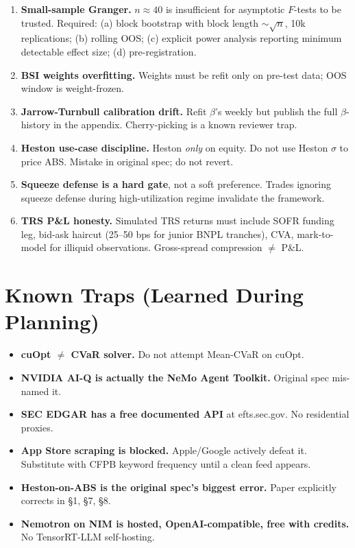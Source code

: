 \documentclass[11pt]{article}
\newcommand{\inlinecode}[1]{{\ttfamily\small #1}}
\begin{document}
\begin{enumerate}
  \item \textbf{Small-sample Granger.} $n \approx 40$ is insufficient for asymptotic $F$-tests to be trusted. Required: (a) block bootstrap with block length $\sim \sqrt{n}$, 10k replications; (b) rolling OOS; (c) explicit power analysis reporting minimum detectable effect size; (d) pre-registration.
  \item \textbf{BSI weights overfitting.} Weights must be refit only on pre-test data; OOS window is weight-frozen.
  \item \textbf{Jarrow-Turnbull calibration drift.} Refit $\beta$'s weekly but publish the full $\beta$-history in the appendix. Cherry-picking is a known reviewer trap.
  \item \textbf{Heston use-case discipline.} Heston \emph{only} on equity. Do not use Heston $\sigma$ to price ABS. Mistake in original spec; do not revert.
  \item \textbf{Squeeze defense is a hard gate}, not a soft preference. Trades ignoring squeeze defense during high-utilization regime invalidate the framework.
  \item \textbf{TRS P\&L honesty.} Simulated TRS returns must include SOFR funding leg, bid-ask haircut (25--50 bps for junior BNPL tranches), CVA, mark-to-model for illiquid observations. Gross-spread compression $\ne$ P\&L.
\end{enumerate}

\section{Known Traps (Learned During Planning)}

\begin{itemize}
  \item \textbf{cuOpt $\ne$ CVaR solver.} Do not attempt Mean-CVaR on cuOpt.
  \item \textbf{NVIDIA AI-Q is actually the NeMo Agent Toolkit.} Original spec mis-named it.
  \item \textbf{SEC EDGAR has a free documented API} at \inlinecode{efts.sec.gov}. No residential proxies.
  \item \textbf{App Store scraping is blocked.} Apple/Google actively defeat it. Substitute with CFPB keyword frequency until a clean feed appears.
  \item \textbf{Heston-on-ABS is the original spec's biggest error.} Paper explicitly corrects in \S1, \S7, \S8.
  \item \textbf{Nemotron on NIM is hosted, OpenAI-compatible, free with credits.} No TensorRT-LLM self-hosting.
\end{itemize}
\end{document}
